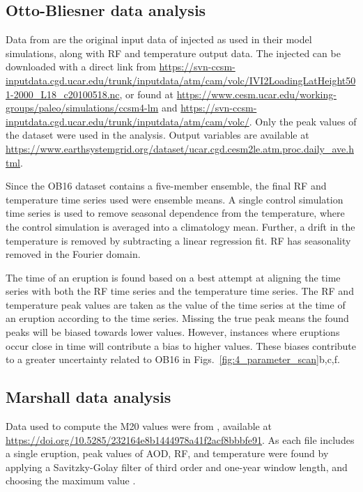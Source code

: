 \documentclass[draft]{agujournal2019}
\begin{document}
\subsection{Otto-Bliesner data analysis}\label{ap:ob16}

Data from  are the original input data of injected  as
used in their model simulations, along with RF and temperature output data. The injected
 can be downloaded with a direct link from
\url{https://svn-ccsm-inputdata.cgd.ucar.edu/trunk/inputdata/atm/cam/volc/IVI2LoadingLatHeight501-2000_L18_c20100518.nc},
or found at \url{https://www.cesm.ucar.edu/working-groups/paleo/simulations/ccsm4-lm}
and \url{https://svn-ccsm-inputdata.cgd.ucar.edu/trunk/inputdata/atm/cam/volc/}. Only
the peak values of the  dataset were used in the analysis. Output variables are
available at
\url{https://www.earthsystemgrid.org/dataset/ucar.cgd.cesm2le.atm.proc.daily_ave.html}.

Since the OB16 dataset contains a five-member ensemble, the final RF and temperature
time series used were ensemble means. A single control simulation time series is used to
remove seasonal dependence from the temperature, where the control simulation is
averaged into a climatology mean. Further, a drift in the temperature is removed by
subtracting a linear regression fit. RF has seasonality removed in the Fourier domain.

The time of an eruption is found based on a best attempt at aligning the  time
series with both the RF time series and the temperature time series. The RF and
temperature peak values are taken as the value of the time series at the time of an
eruption according to the  time series. Missing the true peak means the found
peaks will be biased towards lower values. However, instances where eruptions occur
close in time will contribute a bias to higher values. These biases contribute to a
greater uncertainty related to OB16 in Figs.~\ref{fig:4_parameter_scan}b,c,f.

\subsection{Marshall data analysis}\label{ap:m20}

Data used to compute the M20 values were from , available at
\url{https://doi.org/10.5285/232164e8b1444978a41f2acf8bbbfe91}. As each file includes a
single eruption, peak values of AOD, RF, and temperature were found by applying a
Savitzky-Golay filter of third order and one-year window length, and choosing the
maximum value \cite{savitzky1964}.
\end{document}
